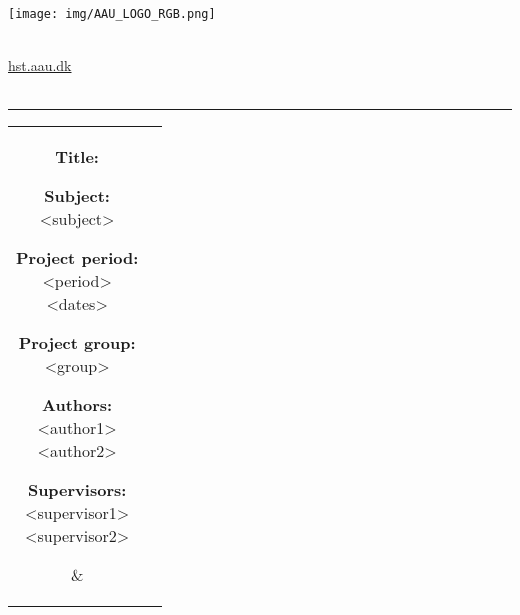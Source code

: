 	\begin{adjustwidth*}{-1.6cm}{-1cm}
		\begin{nopagebreak}
			{\samepage{}
				\parbox{14.5cm}{
					\begin{flushright}
						\texttt{[image: img/AAU\_LOGO\_RGB.png]}\\
					\end{flushright}
					\vspace{0.2cm}
				  \\
				  { \href{http://hst.aau.dk/}{hst.aau.dk}}\\
				  \vspace{-0.8cm}\\
					\hrule
					\vspace{0.2cm}
				}
				
				\begin{tabular}{cc}
					\parbox{6.3cm}{
						\hspace{2cm}
						\begin{description}
							\item {\textbf{Title:}}\\
								\thetitle
							\item {\textbf{Subject:}}\\
								<subject>\\
							\item {\textbf{Project period:}}\\
							  <period>\\
							  <dates>\\
							\item {\textbf{Project group:}}\\
							  <group>
							\item {\textbf{Authors:}}\\
								<author1>\\
								<author2>\\
							\item {\textbf{Supervisors:}}\\
								<supervisor1>\\
								<supervisor2>\\
						\end{description}
						\vfill
					} &
					\parbox{6.5cm}{
					  \flushright{}
					}
				\end{tabular} \newline
				
}
\end{nopagebreak}
\end{adjustwidth*}
